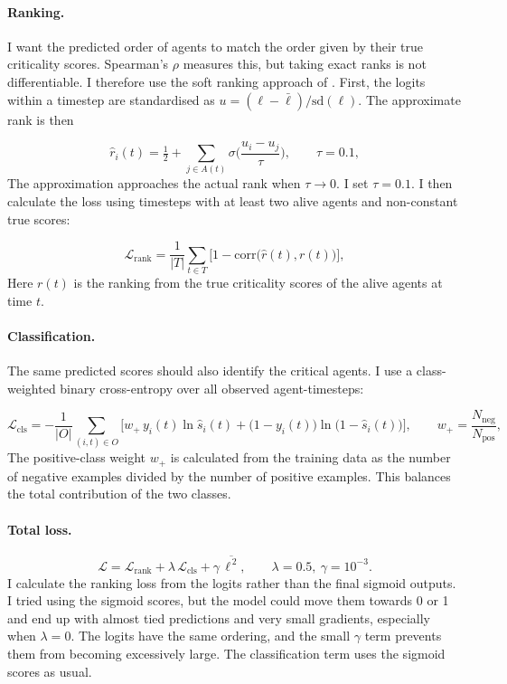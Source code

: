 \documentclass[11pt,a4paper]{article}
\begin{document}
\paragraph{Ranking.} I want the predicted order of agents to match the order given by their true criticality
scores. Spearman's $\rho$ measures this, but taking exact ranks is not differentiable. I therefore use the soft
ranking approach of \cite{qin2010}. First, the logits within a timestep are standardised as
$u=(\ell-\bar\ell)/\mathrm{sd}(\ell)$. The approximate rank is then

\begin{equation}
\hat r_i(t)=\tfrac12+\sum_{j\in A(t)}\sigma\!\Big(\frac{u_i-u_j}{\tau}\Big),\qquad \tau=0.1,
\end{equation}
The approximation approaches the actual rank when $\tau\to0$. I set $\tau=0.1$. I then calculate the loss
using timesteps with at least two alive agents and non-constant true scores:

\begin{equation}
\mathcal{L}_{\mathrm{rank}}=\frac{1}{|T|}\sum_{t\in T}\Big[1-\mathrm{corr}\big(\hat r(t),r(t)\big)\Big],
\end{equation}
Here $r(t)$ is the ranking from the true criticality scores of the alive agents at time $t$.

\paragraph{Classification.} The same predicted scores should also identify the critical agents. I use a
class-weighted binary cross-entropy over all observed agent-timesteps:

\begin{equation}
\mathcal{L}_{\mathrm{cls}}=-\frac{1}{|O|}\sum_{(i,t)\in O}\Big[w_+\,y_i(t)\ln\hat s_i(t)+\big(1-y_i(t)\big)\ln\big(1-\hat s_i(t)\big)\Big],\qquad
w_+=\frac{N_{\mathrm{neg}}}{N_{\mathrm{pos}}},
\end{equation}
The positive-class weight $w_+$ is calculated from the training data as the number of negative examples divided
by the number of positive examples. This balances the total contribution of the two classes.

\paragraph{Total loss.}
\begin{equation}
\mathcal{L}=\mathcal{L}_{\mathrm{rank}}+\lambda\,\mathcal{L}_{\mathrm{cls}}+\gamma\,\overline{\ell^{\,2}},\qquad \lambda=0.5,\ \gamma=10^{-3}.
\end{equation}
I calculate the ranking loss from the logits rather than the final sigmoid outputs. I tried using the sigmoid
scores, but the model could move them towards 0 or 1 and end up with almost tied predictions and very small
gradients, especially when $\lambda=0$. The logits have the same ordering, and the small $\gamma$ term prevents
them from becoming excessively large. The classification term uses the sigmoid scores as usual.
\end{document}
